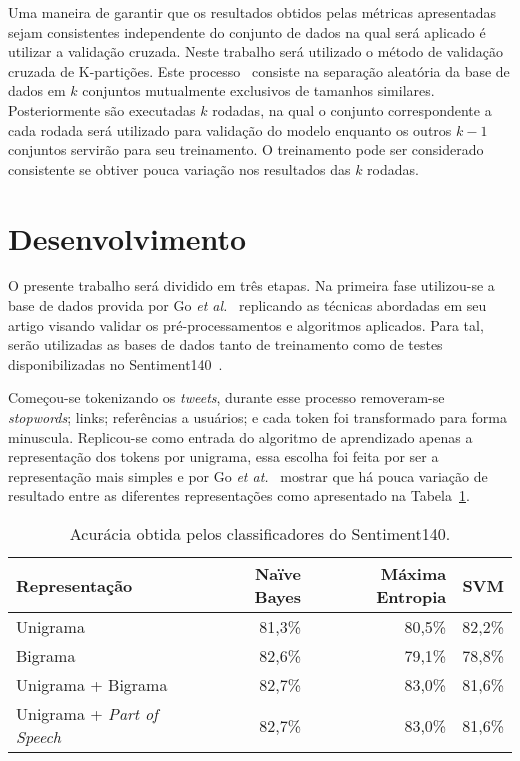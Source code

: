 Uma maneira de garantir que os resultados obtidos pelas métricas apresentadas sejam consistentes independente do
conjunto de dados na qual será aplicado é utilizar a validação cruzada.
Neste trabalho será utilizado o método de validação cruzada de K-partições.
Este processo~\cite{kohavi95} consiste na separação aleatória da base de dados em $k$ conjuntos mutualmente exclusivos
de tamanhos similares.
Posteriormente são executadas $k$ rodadas, na qual o conjunto correspondente a cada rodada será utilizado para validação
do modelo enquanto os outros $k-1$ conjuntos servirão para seu treinamento.
O treinamento pode ser considerado consistente se obtiver pouca variação nos resultados das $k$ rodadas.

\section{Desenvolvimento} \label{sec:desenvolvimento}

O presente trabalho será dividido em três etapas.
Na primeira fase utilizou-se a base de dados provida por Go \textit{et al.}~\cite{go09} replicando as técnicas
abordadas em seu artigo visando validar os pré-processamentos e algoritmos aplicados.
Para tal, serão utilizadas as bases de dados tanto de treinamento como de testes disponibilizadas no
Sentiment140~\cite{go09}.

Começou-se tokenizando os \textit{tweets}, durante esse processo removeram-se \textit{stopwords}; links; referências a
usuários; e cada token foi transformado para forma minuscula.
Replicou-se como entrada do algoritmo de aprendizado apenas a representação dos tokens por unigrama, essa escolha foi
feita por ser a representação mais simples e por Go \textit{et at.}~\cite{go09} mostrar que há pouca variação de
resultado entre as diferentes representações como apresentado na Tabela~\ref{tab:go}.

\begin{table}[h]
    \begin{center}
        \begin{tabular}{| l | r | r | r |}
        \hline
        \textbf{Representação} & \textbf{Naïve Bayes} & \textbf{Máxima Entropia} & \textbf{SVM} \\ \hline
        Unigrama & 81,3\% & 80,5\% & 82,2\% \\ \hline
        Bigrama &  82,6\% & 79,1\% & 78,8\% \\ \hline
        Unigrama + Bigrama & 82,7\% & 83,0\% & 81,6\% \\ \hline
        Unigrama + \textit{Part of Speech} & 82,7\% & 83,0\% & 81,6\% \\ \hline
        \end{tabular}
        \caption{Acurácia obtida pelos classificadores do Sentiment140.}
        \label{tab:go}
    \end{center}
\end{table}

